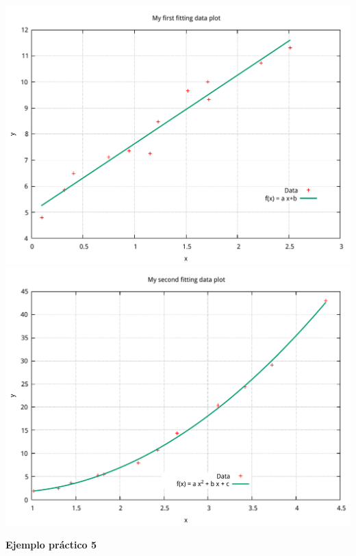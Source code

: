 \documentclass[11.5pt,a4paper]{article}
\begin{document}
\includegraphics[scale=0.38]{ejemplo8.pdf}
\includegraphics[scale=0.38]{ejemplo9.pdf}

\textbf{Ejemplo práctico 5}
\end{document}
